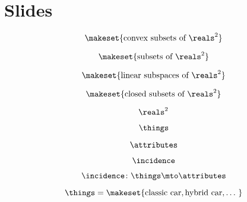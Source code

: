 
\section{Slides}

\begin{forslides}

    \begin{equation}
        \label{eq:slides_adjunctions_1}
        \makeset{\text{convex subsets of } \reals^2}
    \end{equation}

    \begin{equation}
        \label{eq:slides_adjunctions_2}
        \makeset{\text{subsets of } \reals^2}
    \end{equation}

    \begin{equation}
        \label{eq:slides_adjunctions_3}
        \makeset{\text{linear subspaces of } \reals^2}
    \end{equation}

    \begin{equation}
        \label{eq:slides_adjunctions_4}
        \makeset{\text{closed subsets of } \reals^2}
    \end{equation}

    \begin{equation}
        \label{eq:slides_adjunctions_5}
        \reals^2
    \end{equation}

    \begin{equation}
        \label{eq:slides_adjunctions_6}
        \things
    \end{equation}

    \begin{equation}
        \label{eq:slides_adjunctions_7}
        \attributes
    \end{equation}

    \begin{equation}
        \label{eq:slides_adjunctions_8}
        \incidence
    \end{equation}

    \begin{equation}
        \label{eq:slides_adjunctions_9}
        \incidence \colon \things \mto \attributes
    \end{equation}

    \begin{equation}
        \label{eq:slides_adjunctions_10}
        \things = \makeset{\text{classic car} ,\text{hybrid car}, \dots \ }
    \end{equation}


\end{forslides}
